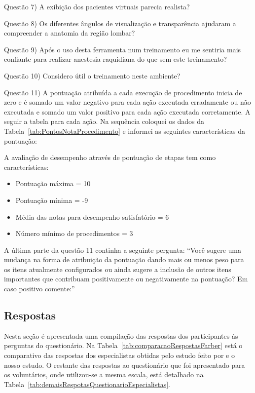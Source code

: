 Questão 7) A exibição dos pacientes virtuais parecia realista?

Questão 8) Os diferentes ângulos de visualização e transparência ajudaram a compreender a anatomia da região lombar?

Questão 9) Após o uso desta ferramenta num treinamento eu me sentiria mais confiante para realizar anestesia raquidiana do que sem este treinamento?

Questão 10) Considero útil o treinamento neste ambiente?

Questão 11) A pontuação atribuída a cada execução de procedimento inicia de zero e é somado um valor negativo para cada ação executada erradamente ou não executada e somado um valor positivo para cada ação executada corretamente. A seguir a tabela para cada ação. Na sequência coloquei os dados da Tabela~\ref{tab:PontosNotaProcedimento} e informei as seguintes características da pontuação:

A avaliação de desempenho através de pontuação de etapas tem como características:
\begin{itemize}
   \item Pontuação máxima = 10
   \item Pontuação mínima = -9
   \item Média das notas para desempenho satisfatório = 6
   \item Número mínimo de procedimentos = 3
 \end{itemize}

A última parte da questão 11 continha a seguinte pergunta:
``Você sugere uma mudança na forma de atribuição da pontuação dando mais ou menos peso para os itens atualmente configurados ou ainda sugere a inclusão de outros itens importantes que contribuam positivamente ou negativamente na pontuação? Em caso positivo comente:''

\subsection{Respostas}
\label{sec:respostasEspecialistas}

Nesta seção é apresentada uma compilação das respostas dos participantes às perguntas do questionário. Na Tabela~\ref{tab:comparacaoRespostasFarber} está o comparativo das respostas dos especialistas obtidas pelo estudo feito por \textcite{Farber2009} e o nosso estudo. O restante das respostas ao questionário que foi apresentado para os voluntários, onde utilizou-se a mesma escala, está detalhado na Tabela~\ref{tab:demaisRespotasQuestionarioEspecialistas}.

